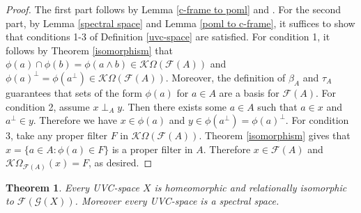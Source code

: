 \documentclass[10pt,a4paper]{amsart}
\newtheorem{theorem}{Theorem}[section]
\begin{document}
\begin{proof}
    The first part follows by Lemma \ref{c-frame to poml} and \cite[Lemma 4.1.2]{mcdonald}. For the second part, by Lemma \ref{spectral space} and Lemma \ref{poml to c-frame}, it suffices to show that conditions 1-3 of Definition \ref{uvc-space} are satisfied. For condition 1, it follows by Theorem \ref{isomorphism} that $\phi(a)\cap\phi(b)=\phi(a\wedge b)\in\mathcal{K}\Omega(\mathcal{F}(A))$ and $\phi(a)^{\perp}=\phi(a^{\perp})\in\mathcal{K}\Omega(\mathcal{F}(A))$. Moreover, the definition of $\beta_A$ and $\tau_A$ guarantees that sets of the form $\phi(a)$ for $a\in A$ are a basis for $\mathcal{F}(A)$. For condition 2, assume $x\perp_Ay$. Then there exists some $a\in A$ such that $a\in x$ and $a^{\perp}\in y$. Therefore we have $x\in\phi(a)$ and $y\in\phi(a^{\perp})=\phi(a)^{\perp}$. For condition 3, take any proper filter $F$ in $\mathcal{K}\Omega(\mathcal{F}(A))$. Theorem \ref{isomorphism} gives that $x=\{a\in A:\phi(a)\in F\}$ is a proper filter in $A$. Therefore $x\in\mathcal{F}(A)$ and $\mathcal{K}\Omega_{\mathcal{F}(A)}(x)=F$, as desired.    
\end{proof}

\begin{theorem}\label{homeomorphism}
    Every UVC-space $X$ is homeomorphic and relationally isomorphic to $\mathcal{F}(\mathcal{G}(X))$. Moreover every UVC-space is a spectral space.  
\end{theorem}
\end{document}
